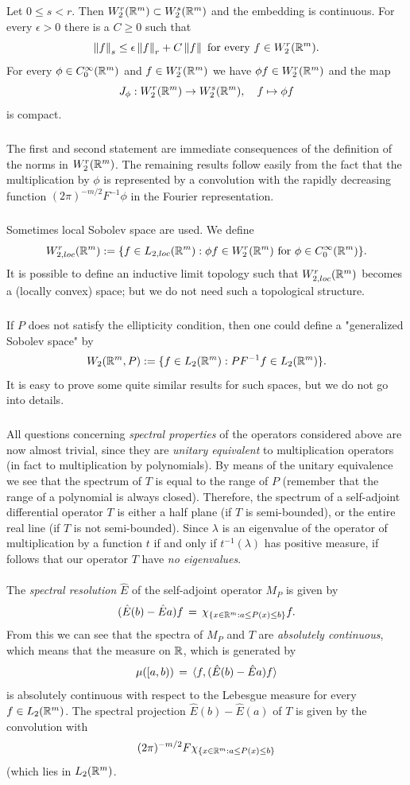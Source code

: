 \documentclass[11pt,twoside]{article}
\begin{document}
\begin{theorem}
Let $0 \leq s < r$.
Then $W_2^r({\mathbb{R}}^m) \subset W_2^s({\mathbb{R}}^m)$ and the embedding is continuous.
For every $\epsilon > 0$ there is a $C \geq 0$ such that
\[
\left\lVert f \right\rVert_s \leq \epsilon \left\lVert f \right\rVert_r + C \left\lVert f \right\rVert
\mbox{ for every } f \in W_2^r({\mathbb{R}}^m).
\]
For every $\phi \in C_0^{\infty}({\mathbb{R}}^m)$ and $f \in W_2^r({\mathbb{R}}^m)$ we have
$\phi f \in W_2^r({\mathbb{R}}^m)$ and the map
\[
J_\phi: W_2^r({\mathbb{R}}^m) \to W_2^s({\mathbb{R}}^m), \quad f \mapsto \phi f
\]
is compact.
\end{theorem}

\subparagraph*{}
The first and second statement are immediate consequences of the
definition of the norms in $W_2^r({\mathbb{R}}^m)$.
The remaining results follow easily from the fact that the multiplication
by $\phi$ is represented by a convolution with the rapidly decreasing
function $(2\pi)^{-m/2} F^{-1} \phi$ in the Fourier representation.

\subparagraph*{}
Sometimes local Sobolev space are used.
We define
\[
W^r_{2,loc}({\mathbb{R}}^m) := \{ f \in L_{2,loc}({\mathbb{R}}^m):
\phi f \in W_2^r({\mathbb{R}}^m)
\mbox{ for } \phi \in C_0^{\infty}({\mathbb{R}}^m) \}.
\]
It is possible to define an inductive limit topology such that
$W^r_{2,loc}({\mathbb{R}}^m)$ becomes a (locally convex) {\FRECHET} space;
but we do not need such a topological structure.

\subparagraph*{}
If $P$ does not satisfy the ellipticity condition,
then one could define a "generalized Sobolev space" by
\[
W_2({\mathbb{R}}^m,P) := \{ f \in L_2({\mathbb{R}}^m): PF^{-1}f \in L_2({\mathbb{R}}^m) \}.
\]
It is easy to prove some quite similar results for such spaces,
but we do not go into details.

\subparagraph*{}
All questions concerning \textit{spectral properties} of the operators
considered above are now almost trivial,
since they are \textit{unitary equivalent} to multiplication operators
(in fact to multiplication by polynomials).
By means of the unitary equivalence we see that the spectrum of $T$
is equal to the range of $P$
(remember that the range of a polynomial is always closed).
Therefore,
the spectrum of a self-adjoint differential operator $T$ is either
a half plane (if $T$ is semi-bounded),
or the entire real line (if $T$ is not semi-bounded).
Since $\lambda$ is an eigenvalue of the operator of multiplication by
a function $t$ if and only if $t^{-1}(\lambda)$ has positive measure,
if follows that our operator $T$ have \textit{no eigenvalues}.

\paragraph*{}
The \textit{spectral resolution} $\hat{E}$ of the self-adjoint operator
$M_P$ is given by
\[
(\hat{E}(b) - \hat{E}a) f \,=\, 
\chi_{\{x \in {\mathbb{R}}^m: a \leq P(x) \leq b\}} f.
\]
From this we can see that the spectra of $M_P$ and $T$ are
\textit{absolutely continuous},
which means that the measure on ${\mathbb{R}}$,
which is generated by
\[
\mu([a,b)) \,=\, \langle f,(\hat{E}(b) - \hat{E}a) f \rangle
\]
is absolutely continuous with respect to the Lebesgue measure
for every $f \in L_2({\mathbb{R}}^m)$.
The spectral projection $\hat{E}(b)-\hat{E}(a)$ of $T$
is given by the convolution with
\[
(2\pi)^{-m/2} F \chi_{\{x \in {\mathbb{R}}^m: a \leq P(x) \leq b\}}
\]
(which lies in $L_2({\mathbb{R}}^m)$.
\end{document}
